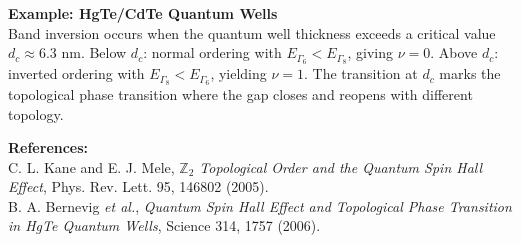 \begin{technical}
\textbf{Example: HgTe/CdTe Quantum Wells}\\[0.5em]
Band inversion occurs when the quantum well thickness exceeds a critical value $d_c \approx 6.3$ nm. Below $d_c$: normal ordering with $E_{\Gamma_6} < E_{\Gamma_8}$, giving $\nu = 0$. Above $d_c$: inverted ordering with $E_{\Gamma_8} < E_{\Gamma_6}$, yielding $\nu = 1$. The transition at $d_c$ marks the topological phase transition where the gap closes and reopens with different topology.

\vspace{0.5em}
\textbf{References:}\\
C. L. Kane and E. J. Mele, \textit{$\mathbb{Z}_2$ Topological Order and the Quantum Spin Hall Effect}, Phys. Rev. Lett. 95, 146802 (2005).\\
B. A. Bernevig \textit{et al.}, \textit{Quantum Spin Hall Effect and Topological Phase Transition in HgTe Quantum Wells}, Science 314, 1757 (2006).
\end{technical}
